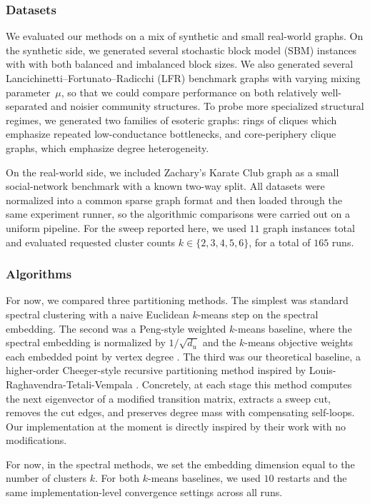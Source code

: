 \documentclass{article}
\theoremstyle{definition}
\theoremstyle{remark}
\begin{document}
\subsubsection{Datasets}
We evaluated our methods on a mix of synthetic and small real-world graphs. On the synthetic side, we generated several stochastic block model (SBM) instances with with both balanced and imbalanced block sizes. We also generated several Lancichinetti--Fortunato--Radicchi (LFR) benchmark graphs with varying mixing parameter~$\mu$, so that we could compare performance on both relatively well-separated and noisier community structures. To probe more specialized structural regimes, we generated two families of esoteric graphs: rings of cliques which emphasize repeated low-conductance bottlenecks, and core-periphery clique graphs, which emphasize degree heterogeneity.

On the real-world side, we included Zachary's Karate Club graph as a small social-network benchmark with a known two-way split. All datasets were normalized into a common sparse graph format and then loaded through the same experiment runner, so the algorithmic comparisons were carried out on a uniform pipeline. For the sweep reported here, we used $11$ graph instances total and evaluated requested cluster counts $k \in \{2,3,4,5,6\}$, for a total of $165$ runs.

\subsubsection{Algorithms}
For now, we compared three partitioning methods. The simplest was standard spectral clustering with a naive Euclidean $k$-means step on the spectral embedding. The second was a Peng-style weighted $k$-means baseline, where the spectral embedding is normalized by $1/\sqrt{d_u}$ and the $k$-means objective weights each embedded point by vertex degree \cite{peng2015partitioning}. The third was our theoretical baseline, a higher-order Cheeger-style recursive partitioning method inspired by Louis-Raghavendra-Tetali-Vempala \cite{louis2012}. Concretely, at each stage this method computes the next eigenvector of a modified transition matrix, extracts a sweep cut, removes the cut edges, and preserves degree mass with compensating self-loops. Our implementation at the moment is directly inspired by their work with no modifications.

For now, in the spectral methods, we set the embedding dimension equal to the number of clusters $k$. For both $k$-means baselines, we used $10$ restarts and the same implementation-level convergence settings across all runs.
\end{document}
